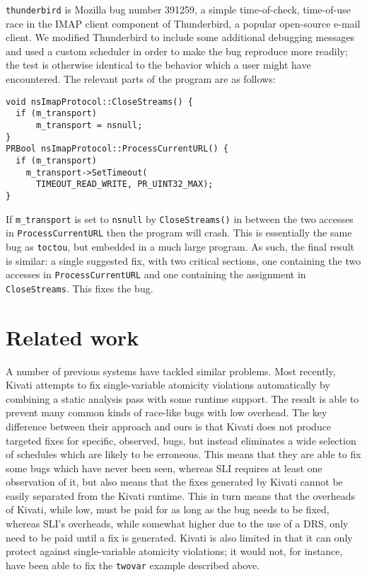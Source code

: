 \documentclass[10pt,letter,twocolumn]{sigplanconf}
\newcommand{\editorial}[1]{}
\begin{document}
\verb|thunderbird| is Mozilla bug number
391259\cite{thunderbird39125}, a simple time-of-check, time-of-use
race in the IMAP client component of Thunderbird, a popular
open-source e-mail client.  We modified Thunderbird to include some
additional debugging messages and used a custom scheduler in order to
make the bug reproduce more readily; the test is otherwise identical
to the behavior which a user might have encountered.  The relevant
parts of the program are as follows:

\begin{verbatim}
void nsImapProtocol::CloseStreams() {
  if (m_transport)
      m_transport = nsnull;
}
PRBool nsImapProtocol::ProcessCurrentURL() {
  if (m_transport)
    m_transport->SetTimeout(
      TIMEOUT_READ_WRITE, PR_UINT32_MAX);
}
\end{verbatim}

\noindent
If \verb|m_transport| is set to \verb|nsnull| by \verb|CloseStreams()|
in between the two accesses in \verb|ProcessCurrentURL| then the
program will crash.  This is essentially the same bug as
\verb|toctou|, but embedded in a much large program.  As such, the
final result is similar: a single suggested fix, with two critical
sections, one containing the two accesses in \verb|ProcessCurrentURL|
and one containing the assignment in \verb|CloseStreams|.  This fixes
the bug.

\section{Related work}\editorial{This is a bit of a bestiary.  Could do with a bit more analysis.}

A number of previous systems have tackled similar problems.  Most
recently, Kivati\cite{Chew2010a} attempts to fix single-variable
atomicity violations automatically by combining a static analysis pass
with some runtime support.  The result is able to prevent many common
kinds of race-like bugs with low overhead.  The key difference between
their approach and ours is that Kivati does not produce targeted fixes
for specific, observed, bugs, but instead eliminates a wide selection
of schedules which are likely to be erroneous.  This means that they
are able to fix some bugs which have never been seen, whereas SLI
requires at least one observation of it, but also means that the fixes
generated by Kivati cannot be easily separated from the Kivati
runtime.  This in turn means that the overheads of Kivati, while low,
must be paid for as long as the bug needs to be fixed, whereas SLI's
overheads, while somewhat higher due to the use of a DRS, only need to
be paid until a fix is generated.  Kivati is also limited in that it
can only protect against single-variable atomicity violations; it
would not, for instance, have been able to fix the \verb|twovar|
example described above.
\end{document}
